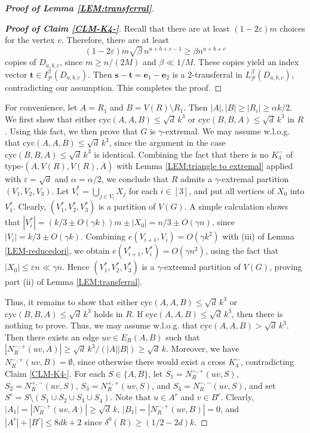 \documentclass[11pt,a4paper,reqno]{amsart}
\theoremstyle{definition} %
\begin{document}
\begin{proof}[\textbf{Proof of Lemma \ref{LEM:transferral}}]
\begin{proof}[\textbf{Proof of Claim \ref{CLM-K4-}}]
Recall that there are at least $(1-2\varepsilon)m$ choices for the vertex $v$. Therefore, there are at least
$$
(1-2\varepsilon)m\sqrt{\beta}\, n^{a+b+c-1}\geqslant \beta n^{a+b+c}
$$
copies of $D_{a,b,c}$, since $m\geqslant n/(2M)$ and $\beta\ll 1/M$. These copies yield an index vector $\mathbf{t}\in I_\mathcal{P}^\beta(D_{a,b,c})$. Then $\mathbf{s}-\mathbf{t}=\mathbf{e}_1-\mathbf{e}_2$ is a $2$-transferral in $L_\mathcal{P}^\beta(D_{a,b,c})$, contradicting our assumption. This completes the proof.
\end{proof}



For convenience, let $A=R_1$ and $B=V(R)\setminus R_1$. Then
$|A|,|B|\geqslant |R_i|\geqslant \alpha k/2$.
We first show that either $\text{cyc}(A,A,B)\leqslant \sqrt d\, k^3$ or $\text{cyc}(B,B,A)\leqslant \sqrt d\, k^3$ in $R$. Using this fact, we then prove that $G$ is $\gamma$-extremal. We may  assume w.l.o.g. that $\text{cyc}(A,A,B)\leqslant \sqrt d\, k^3$, since the argument in the case $\text{cyc}(B,B,A)\leqslant \sqrt d\, k^3$ is identical. Combining the fact that there is no $K^-_4$ of type-$(A,V(R),V(R),\overline{A})$ with Lemma \ref{LEM:triangle to extremal} applied with $\varepsilon=\sqrt d$ and $\alpha=\alpha/2$, we conclude that $R$ admits a $\gamma$-extremal partition $(V_1,V_2,V_3)$. Let $V^\ast_i=\bigcup_{j\in V_i}X_j$ for each $i\in[3]$, and put all vertices of $X_0$ into $V^\ast_1$. Clearly, $(V^\ast_1,V^\ast_2,V^\ast_3)$ is a partition of $V(G)$. A simple calculation shows that
$|V^\ast_i|=(k/3\pm O(\gamma k))m\pm |X_0|=n/3\pm O(\gamma n)$,
since $|V_i|=k/3\pm O(\gamma k)$. Combining
$e(V_{i+1},V_i)=O(\gamma k^2)$ with (iii) of Lemma \ref{LEM-reducedori}, we obtain
$e(V^\ast_{i+1},V^\ast_i)=O(\gamma n^2)$,
using the fact that $|X_0|\leqslant \varepsilon n\ll \gamma n$. Hence $(V^\ast_1,V^\ast_2,V^\ast_3)$ is a $\gamma$-extremal partition of $V(G)$, proving part (ii) of Lemma \ref{LEM:transferral}.

Thus, it remains to show that either $\text{cyc}(A,A,B)\leqslant \sqrt d\, k^3$ or $\text{cyc}(B,B,A)\leqslant \sqrt d\, k^3$ holds in $R$. If $\text{cyc}(A,A,B)\leqslant \sqrt d\, k^3$, then there is nothing to prove. Thus, we may assume w.l.o.g. that $\text{cyc}(A,A,B)> \sqrt d\, k^3$. Then there exists an edge $uv\in E_R(A,B)$ such that
$|N_R^{-,+}(uv,A)|\geqslant \sqrt d\, k^3/(|A||B|)\geqslant \sqrt d\, k$.
Moreover, we have $N_R^{-,+}(uv,B)=\emptyset$, since otherwise there would exist a cross $K_4^-$, contradicting Claim \ref{CLM-K4-}. For each $S\in\{A,B\}$, let
$S_1=N_R^{-,+}(uv,S)$, $S_2=N_R^{+,-}(uv,S)$, $S_3=N_R^{+,+}(uv,S)$, and $S_4=N_R^{-,-}(uv,S)$, and set
$S^r=S\setminus(S_1\cup S_2\cup S_3\cup S_4)$.
Note that $u\in A^r$ and $v\in B^r$. Clearly,
$|A_1|=|N_R^{-,+}(uv,A)|\geqslant \sqrt d\, k$,
$|B_1|=|N_R^{-,+}(uv,B)|=0$, and
$|A^r|+|B^r|\leqslant 8dk+2$ since $\delta^0(R)\geqslant(1/2-2d)k$.


\end{proof}
\end{document}
